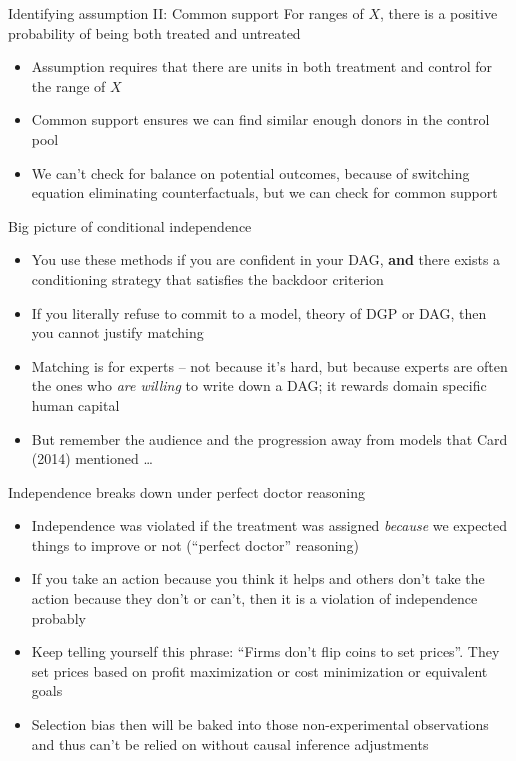 \documentclass{beamer}
\begin{document}
\begin{frame}[plain]

	\begin{block}{Identifying assumption II: Common support}
	For ranges of $X$, there is a positive probability of being both treated and untreated
	\end{block}
	
	\begin{itemize}
	\item Assumption requires that there are units in both treatment and control for the range of $X$
	\item Common support ensures we can find similar enough donors in the control pool
	\item We can't check for balance on potential outcomes, because of switching equation eliminating counterfactuals, but we can check for common support 
	\end{itemize}
\end{frame}




\begin{frame}{Big picture of conditional independence}

\begin{itemize}
\item You use these methods if you are confident in your DAG, \textbf{and} there exists a conditioning strategy that satisfies the backdoor criterion
\item If you literally refuse to commit to a model, theory of DGP or DAG, then you cannot justify matching
\item Matching is for experts -- not because it's hard, but because experts are often the ones who \emph{are willing} to write down a DAG; it rewards domain specific human capital 
\item But remember the audience and the progression away from models that Card (2014) mentioned \dots
\end{itemize}

\end{frame}


\begin{frame}{Independence breaks down under perfect doctor reasoning}

\begin{itemize}
\item Independence was violated if the treatment was assigned \emph{because} we expected things to improve or not (``perfect doctor'' reasoning)
\item If you take an action because you think it helps and others don't take the action because they don't or can't, then it is a violation of independence probably
\item Keep telling yourself this phrase: ``Firms don't flip coins to set prices''. They set prices based on profit maximization or cost minimization or equivalent goals
\item Selection bias then will be baked into those non-experimental observations and thus can't be relied on without causal inference adjustments
\end{itemize}

\end{frame}
\end{document}
